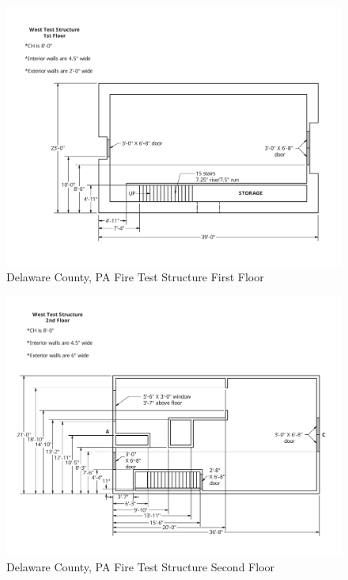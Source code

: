 \documentclass{article}
\begin{document}
\clearpage

\begin{figure}[!ht]
	\centering
	\includegraphics[width=4.5in]{Figures/Air_Entrainment/West_Test_Structure_1st_Floor_original_nodim.pdf}
	\caption{Delaware County, PA Fire Test Structure First Floor}
	\label{fig:Delaware_County,_PA_Fire_Test_Structure_First_Floor}
\end{figure}

\begin{figure}[!ht]
	\centering
	\includegraphics[width=4.5in]{Figures/Air_Entrainment/West_Test_Structure_2nd_Floor_nodim.pdf}
	\caption{Delaware County, PA Fire Test Structure Second Floor}
	\label{fig:Delaware_County,_PA_Fire_Test_Structure_Second_Floor}
\end{figure}

\clearpage
\end{document}
